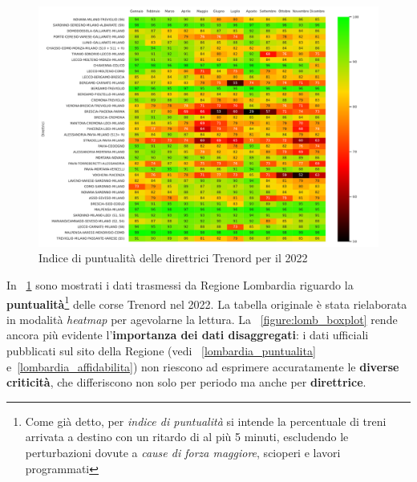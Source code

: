 \documentclass[12pt,italian]{report}
\begin{document}
\begin{figure}
    \centering
    \includegraphics[width=1\textwidth]{images/lomb_heatmap.pdf}
    \caption{Indice di puntualità delle direttrici Trenord per il
        2022}
    \label{figure:lomb_heatmap}
\end{figure}

In \figurename~\ref{figure:lomb_heatmap} sono mostrati i dati trasmessi da Regione Lombardia
riguardo la \textbf{puntualità}\footnote{Come già detto, per
    \textit{indice di puntualità} si intende la percentuale di treni
    arrivata a destino con un ritardo di al più 5 minuti, escludendo
    le perturbazioni dovute a \textit{cause di forza maggiore},
    scioperi e lavori programmati} delle corse Trenord nel 2022.  La
tabella originale è stata rielaborata in modalità \textit{heatmap} per
agevolarne la lettura.  La \figurename~\ref{figure:lomb_boxplot} rende
ancora più evidente l'\textbf{importanza dei dati disaggregati}: i
dati ufficiali pubblicati sul sito della Regione (vedi
\figurename~\ref{lombardia_puntualita} e~\ref{lombardia_affidabilita})
non riescono ad esprimere accuratamente le \textbf{diverse criticità},
che differiscono non solo per periodo ma anche per
\textbf{direttrice}.
\end{document}
